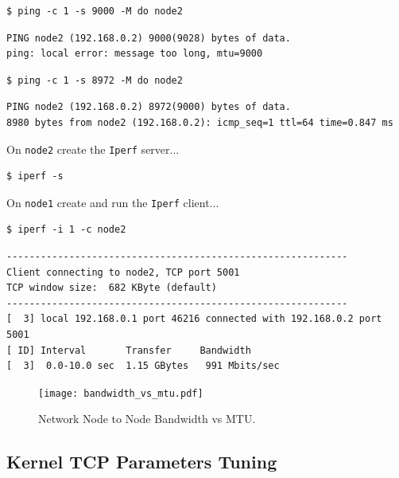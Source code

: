 \documentclass{report}
\begin{document}
\lstset{style=termstyle}
\begin{lstlisting}
$ ping -c 1 -s 9000 -M do node2
\end{lstlisting}

\lstset{style=termstyle}
\begin{lstlisting}
PING node2 (192.168.0.2) 9000(9028) bytes of data.
ping: local error: message too long, mtu=9000
\end{lstlisting}

\lstset{style=termstyle}
\begin{lstlisting}
$ ping -c 1 -s 8972 -M do node2
\end{lstlisting}

\lstset{style=termstyle}
\begin{lstlisting}
PING node2 (192.168.0.2) 8972(9000) bytes of data.
8980 bytes from node2 (192.168.0.2): icmp_seq=1 ttl=64 time=0.847 ms
\end{lstlisting}


On \verb|node2| create the \verb|Iperf| server...

\lstset{style=termstyle}
\begin{lstlisting}
$ iperf -s
\end{lstlisting}

On \verb|node1| create and run the \verb|Iperf| client...

\lstset{style=termstyle}
\begin{lstlisting}
$ iperf -i 1 -c node2
\end{lstlisting}

\lstset{style=termstyle}
\begin{lstlisting}
------------------------------------------------------------
Client connecting to node2, TCP port 5001
TCP window size:  682 KByte (default)
------------------------------------------------------------
[  3] local 192.168.0.1 port 46216 connected with 192.168.0.2 port 5001
[ ID] Interval       Transfer     Bandwidth
[  3]  0.0-10.0 sec  1.15 GBytes   991 Mbits/sec
\end{lstlisting}


\begin{figure}
	\centering	
	\texttt{[image: bandwidth\_vs\_mtu.pdf]}
	\caption{Network Node to Node Bandwidth vs MTU.}
\end{figure}


\subsection{Kernel TCP Parameters Tuning}
\end{document}
